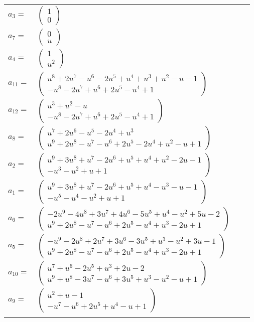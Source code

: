 \documentclass[1p]{elsarticle_modified}
\theoremstyle{definition}
\begin{document}
\begin{tabular}{m{7pt} m{180pt} m{7pt} m{180pt} }
\flushright $a_{3}=$&$\begin{pmatrix}1\\0\end{pmatrix}$ \\
\flushright $a_{7}=$&$\begin{pmatrix}0\\u\end{pmatrix}$ \\
\flushright $a_{4}=$&$\begin{pmatrix}1\\u^2\end{pmatrix}$ \\
\flushright $a_{11}=$&$\begin{pmatrix}u^8+2 u^7- u^6-2 u^5+u^4+u^3+u^2- u-1\\- u^8-2 u^7+u^6+2 u^5- u^4+1\end{pmatrix}$ \\
\flushright $a_{12}=$&$\begin{pmatrix}u^3+u^2- u\\- u^8-2 u^7+u^6+2 u^5- u^4+1\end{pmatrix}$ \\
\flushright $a_{8}=$&$\begin{pmatrix}u^7+2 u^6- u^5-2 u^4+u^3\\u^9+2 u^8- u^7- u^6+2 u^5-2 u^4+u^2- u+1\end{pmatrix}$ \\
\flushright $a_{2}=$&$\begin{pmatrix}u^9+3 u^8+u^7-2 u^6+u^5+u^4+u^2-2 u-1\\- u^3- u^2+u+1\end{pmatrix}$ \\
\flushright $a_{1}=$&$\begin{pmatrix}u^9+3 u^8+u^7-2 u^6+u^5+u^4- u^3- u-1\\- u^5- u^4- u^2+u+1\end{pmatrix}$ \\
\flushright $a_{6}=$&$\begin{pmatrix}-2 u^9-4 u^8+3 u^7+4 u^6-5 u^5+u^4- u^2+5 u-2\\u^9+2 u^8- u^7- u^6+2 u^5- u^4+u^3-2 u+1\end{pmatrix}$ \\
\flushright $a_{5}=$&$\begin{pmatrix}- u^9-2 u^8+2 u^7+3 u^6-3 u^5+u^3- u^2+3 u-1\\u^9+2 u^8- u^7- u^6+2 u^5- u^4+u^3-2 u+1\end{pmatrix}$ \\
\flushright $a_{10}=$&$\begin{pmatrix}u^7+u^6-2 u^5+u^3+2 u-2\\u^9+u^8-3 u^7- u^6+3 u^5+u^3- u^2- u+1\end{pmatrix}$ \\
\flushright $a_{9}=$&$\begin{pmatrix}u^2+u-1\\- u^7- u^6+2 u^5+u^4- u+1\end{pmatrix}$\\&\end{tabular}
\end{document}
